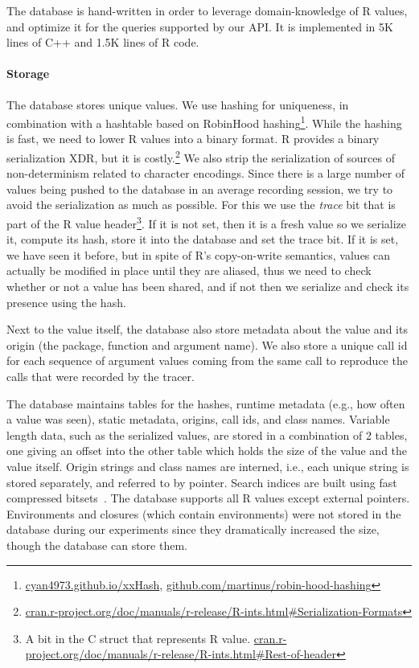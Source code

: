 \documentclass[sigplan,nonacm,anonymous,review]{acmart}
\begin{document}
The database is hand-written in order to leverage domain-knowledge of
R values, and optimize it for the queries supported by our API.  It is
implemented in 5K lines of C++ and 1.5K lines of R code.

\paragraph{Storage}

The database stores unique values.  We use  hashing for
uniqueness, in combination with a hashtable based on RobinHood
hashing\footnote{\url{cyan4973.github.io/xxHash},
\url{github.com/martinus/robin-hood-hashing}}.  While the hashing is
fast, we need to lower R values into a binary format.  R provides a
binary serialization XDR, but it is
costly.\footnote{\url{cran.r-project.org/doc/manuals/r-release/R-ints.html\#Serialization-Formats}}
We also strip the serialization of sources of non-determinism related
to character encodings.  Since there is a large number of values being
pushed to the database in an average recording session, we try to
avoid the serialization as much as possible.  For this we use the
\emph{trace} bit that is part of the R value header\footnote{A bit in
the  C struct that represents R value.
\url{cran.r-project.org/doc/manuals/r-release/R-ints.html\#Rest-of-header}}.
If it is not set, then it is a fresh value so we serialize it, compute
its hash, store it into the database and set the trace bit.  If it is
set, we have seen it before, but in spite of R's copy-on-write
semantics, values can actually be modified in place until they are
aliased, thus we need to check whether or not a value has been shared,
and if not then we serialize and check its presence using the hash.


Next to the value itself, the database also store metadata about the value and its origin (the package, function and argument name).
We also store a unique call id for each sequence of argument values coming from the same call to reproduce the calls that were recorded by the tracer.

The database maintains tables for the hashes, runtime metadata (e.g., how often a value was seen), static metadata, origins, call ids, and class names. 
Variable length data, such as the serialized values, are stored in a combination of 2 tables, one giving an offset into the other table which holds the size of the value and the value itself. 
Origin strings and class names are interned, i.e., each unique string is stored separately, and referred to by pointer. 
Search indices are built using fast compressed bitsets~\cite{chambi2016better}.
The database supports all R values except external pointers.
Environments and closures (which contain environments) were not stored in the database during our experiments since they dramatically increased the size, though the database can store them.
\end{document}
